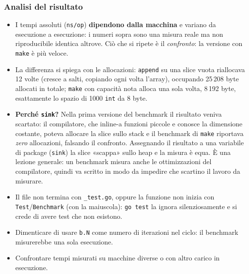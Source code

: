 \documentclass[11pt,a4paper]{report}
\newcommand{\cod}[1]{\texttt{#1}}
\begin{document}
\subsubsection*{Analisi del risultato}

\begin{itemize}
  \item I tempi assoluti (\cod{ns/op}) \textbf{dipendono dalla macchina} e variano
        da esecuzione a esecuzione: i numeri sopra sono una misura reale ma non
        riproducibile identica altrove. Ciò che si ripete è il
        \emph{confronto}: la versione con \cod{make} è più veloce.
  \item La differenza si spiega con le allocazioni: \cod{append} su una slice
        vuota riallocava 12 volte (cresce a salti, copiando ogni volta
        l'array), occupando 25\,208 byte allocati in totale; \cod{make} con
        capacità nota alloca una sola volta, 8\,192 byte, esattamente lo spazio
        di 1000 \cod{int} da 8 byte.
  \item \textbf{Perché \cod{sink}?} Nella prima versione del benchmark il risultato
        veniva scartato: il compilatore, che inline-a funzioni piccole e conosce
        la dimensione costante, poteva allocare la slice sullo stack e il
        benchmark di \cod{make} riportava \emph{zero} allocazioni, falsando il
        confronto. Assegnando il risultato a una variabile di package
        (\cod{sink}) la slice «scappa» sullo heap e la misura è equa. È una
        lezione generale: un benchmark misura anche le ottimizzazioni del
        compilatore, quindi va scritto in modo da impedire che scartino il
        lavoro da misurare.
\end{itemize}

\begin{attenzione}
\begin{itemize}
  \item Il file non termina con \texttt{\_test.go}, oppure la funzione non
        inizia con \cod{Test}/\cod{Benchmark} (con la maiuscola): \cod{go test}
        la ignora silenziosamente e si crede di avere test che non esistono.
  \item Dimenticare di usare \cod{b.N} come numero di iterazioni nel ciclo:
        il benchmark misurerebbe una sola esecuzione.
  \item Confrontare tempi misurati su macchine diverse o con altro carico in
        esecuzione.
\end{itemize}
\end{attenzione}
\end{document}
